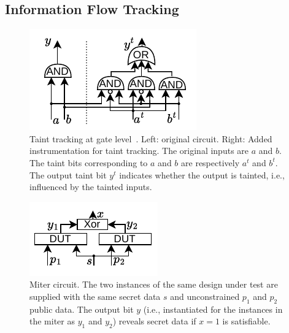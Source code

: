 \subsection{Information Flow Tracking}
\label{subsec:ift}

\begin{figure}[t]
    \begin{center}
    \includegraphics[width=0.5\columnwidth]{figures/glift/glift.pdf}
    \end{center}
    \vspace*{-1em}
    \caption{\label{fig:glift} Taint tracking at gate level~\cite{tiwari2009complete}. Left: original circuit. Right: Added instrumentation for taint tracking. The original inputs are $a$ and $b$. The taint bits corresponding to $a$ and $b$ are respectively $a^t$ and $b^t$. The output taint bit $y^t$ indicates whether the output is tainted, i.e., influenced by the tainted inputs.}
    \vspace*{-1em}
\end{figure}

\begin{figure}[t]
    \begin{center}
    \includegraphics[width=0.5\columnwidth]{figures/miter/miter.pdf}
    \end{center}
    \vspace*{-1em}
    \caption{\label{fig:miter} Miter circuit. The two instances of the same design under test are supplied with the same secret data $s$ and unconstrained $p_1$ and $p_2$ public data. The output bit $y$ (i.e., instantiated for the instances in the miter as $y_1$ and $y_2$) reveals secret data if $x=1$ is satisfiable.}
\end{figure}

